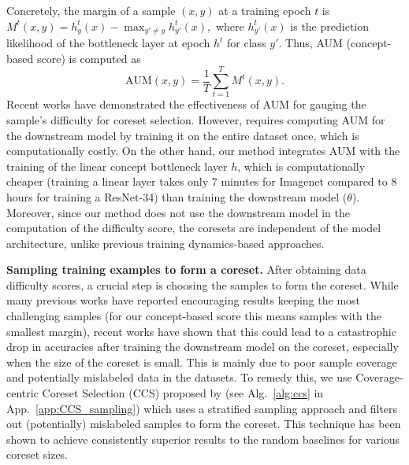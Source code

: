 Concretely, the margin of a sample $(x, y)$ at a training epoch $t$ is
\(M^t(x,y) = h^t_y(x) - \max_{y' \neq y} h^t_{y'}(x), \) where $h^t_{y'}(x)$ is the prediction likelihood of the bottleneck layer at epoch $h^t$ for class $y'$.
Thus, AUM (concept-based score) is computed as
\begin{equation}
\label{eq:aum_true_label}
\mathrm{AUM}(x,y) = \frac{1}{T} \sum_{t=1}^T M^t(x,y).
\end{equation}
Recent works \cite{pleiss2020identifying, zheng2022coverage, zheng2024elfs} have demonstrated the effectiveness of AUM for gauging the sample's difficulty for coreset selection. 
However, \cite{zheng2022coverage,zheng2024elfs} requires computing AUM for the downstream model by training it on the entire dataset once, which is computationally costly. 
On the other hand, our method integrates AUM with the training of the linear concept bottleneck layer $h$, which is computationally cheaper (training a linear layer takes only $7$ minutes for Imagenet compared to $8$ hours for training a ResNet-34) than training the downstream model ($\theta$).
Moreover, since our method does not use the downstream model in the computation of the difficulty score, the coresets are independent of the model architecture, unlike previous training dynamics-based approaches.


{\bf Sampling training examples to form a coreset.} 
After obtaining data difficulty scores, a crucial step is choosing the samples to form the coreset. 
While many previous works \cite{toneva2018empirical, coleman2019selection} have reported encouraging results keeping the most challenging samples (for our concept-based score this means samples with the smallest margin), recent works \cite{zheng2022coverage,sorscher2022beyond} have shown that this could lead to a catastrophic drop in accuracies after training the downstream model on the coreset, especially when the size of the coreset is small.
This is mainly due to poor sample coverage and potentially mislabeled data in the datasets.
To remedy this, we use Coverage-centric Coreset Selection (CCS) proposed by \cite{zheng2022coverage} (see Alg.~\ref{alg:ccs} in App.~\ref{app:CCS_sampling}) which uses a stratified sampling approach and filters out (potentially) mislabeled samples to form the coreset.
This technique has been shown to achieve consistently superior results to the random baselines for various coreset sizes. 


